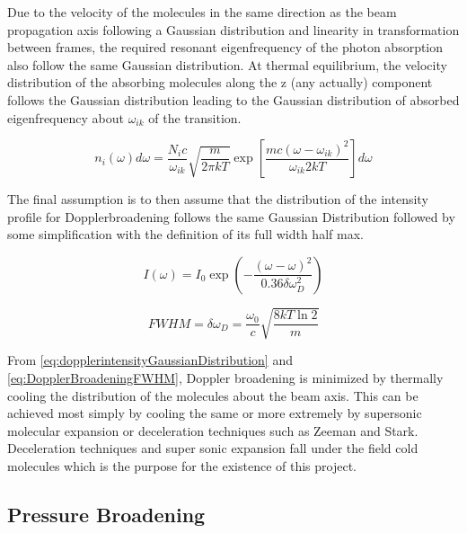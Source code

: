 \documentclass[11pt,a4paper]{book}
\begin{document}
			Due to the velocity of the molecules in the same direction as the beam propagation axis following a Gaussian distribution and linearity in transformation between frames, the required resonant eigenfrequency of the photon absorption also follow the same Gaussian distribution. 
			At thermal equilibrium, the velocity distribution of the absorbing molecules along the z (any actually) component follows the Gaussian distribution
			leading to the Gaussian distribution of absorbed eigenfrequency about $\omega_{ik}$ of the transition.
			
			\begin{equation}
				\label{eq:EigenFrequencyGaussianDistribution}
				n_i(\omega)d\omega = \dfrac{N_i c}{\omega_{ik}} \sqrt{\dfrac{m}{2 \pi k T }} \exp{\left[\frac{m c (\omega-\omega_{ik})^2}{\omega_{ik} 2kT}\right]} d\omega
			\end{equation}
			
			The final assumption is to then assume that the distribution of the intensity profile for Dopplerbroadening follows the same Gaussian Distribution followed by some simplification with the definition of its full width half max.
			
			\begin{equation}
			\label{eq:dopplerintensityGaussianDistribution}
			I(\omega)=I_0 \exp{\left(-\dfrac{(\omega-\omega)^2}{0.36 \delta \omega_{D}^2}\right)}
			\end{equation}
			
			\begin{equation}
			\label{eq:DopplerBroadeningFWHM}
			FWHM=\delta \omega_D =\dfrac{\omega_0}{c} \sqrt{\dfrac{8kT\ln{2}}{m}}
			\end{equation}
			
			From \autoref{eq:dopplerintensityGaussianDistribution} and \autoref{eq:DopplerBroadeningFWHM}, Doppler broadening is minimized by thermally cooling the distribution of the molecules about the beam axis. This can be achieved most simply by cooling the same or more extremely by supersonic molecular expansion or deceleration techniques such as Zeeman and Stark. Deceleration techniques and super sonic expansion fall under the field cold molecules which is the purpose for the existence of this project.
		\subsection{Pressure Broadening}
\end{document}
